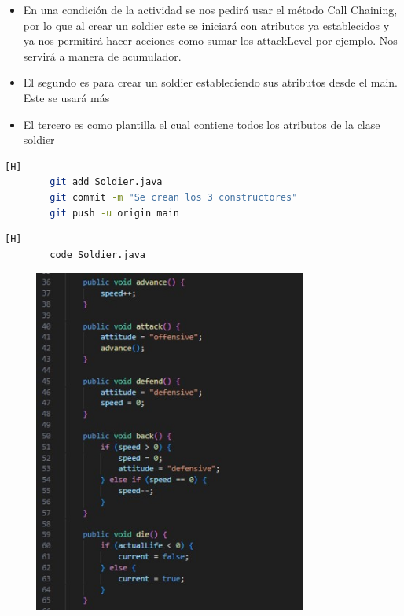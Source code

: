 \documentclass{article}
\begin{document}
	\begin{itemize}	
		\item En una condición de la actividad se nos pedirá usar el método Call Chaining, por lo que al crear un soldier este se iniciará con atributos ya establecidos y ya nos permitirá hacer acciones como sumar los attackLevel por ejemplo. Nos servirá a manera de acumulador.
		\item El segundo es para crear un soldier estableciendo sus atributos desde el main. Este se usará más
		\item El tercero es como plantilla el cual contiene todos los atributos de la clase soldier 
	\end{itemize}
	
	
	\begin{lstlisting}[language=bash,caption={Commit: 59579c7cc3df93a5c893c22138b0b929f99d597e }][H]
		git add Soldier.java
		git commit -m "Se crean los 3 constructores"			
		git push -u origin main
	\end{lstlisting}
	
	
	\begin{lstlisting}[language=bash,caption={Se crean los métodos advance, attack, defend, back, die, beAttacked, scape, getActualLife, setActualLife }][H]
		code Soldier.java
	\end{lstlisting}
	
	\begin{figure}[H]
		\centering
		\includegraphics[width=0.8\textwidth,keepaspectratio]{img/method.jpg}
	\end{figure}
	
\end{document}
